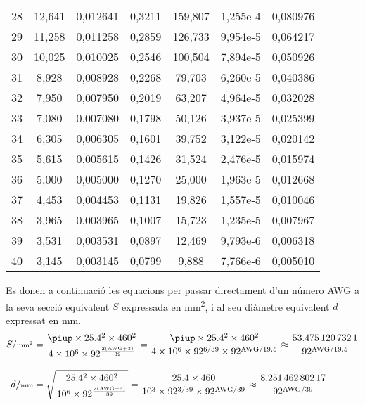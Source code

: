 \begin{longtable}{S[table-format=4.0]S[table-format=3.3]
                  S[table-format=2.6]S[table-format=2.4]
                  S[table-format=6.3]S[table-format=1.3e1]
                  S[table-format=3.6]}
28 &     12,641 &   0,012641 &     0,3211 &    159,807 &  1,255e-4 &   0,080976 \\
29 &     11,258 &   0,011258 &     0,2859 &    126,733 &  9,954e-5 &   0,064217 \\
30 &     10,025 &   0,010025 &     0,2546 &    100,504 &  7,894e-5 &   0,050926 \\
31 &      8,928 &   0,008928 &     0,2268 &     79,703 &  6,260e-5 &   0,040386 \\
32 &      7,950 &   0,007950 &     0,2019 &     63,207 &  4,964e-5 &   0,032028 \\
33 &      7,080 &   0,007080 &     0,1798 &     50,126 &  3,937e-5 &   0,025399 \\
34 &      6,305 &   0,006305 &     0,1601 &     39,752 &  3,122e-5 &   0,020142 \\
35 &      5,615 &   0,005615 &     0,1426 &     31,524 &  2,476e-5 &   0,015974 \\
36 &      5,000 &   0,005000 &     0,1270 &     25,000 &  1,963e-5 &   0,012668 \\
37 &      4,453 &   0,004453 &     0,1131 &     19,826 &  1,557e-5 &   0,010046 \\
38 &      3,965 &   0,003965 &     0,1007 &     15,723 &  1,235e-5 &   0,007967 \\
39 &      3,531 &   0,003531 &     0,0897 &     12,469 &  9,793e-6 &   0,006318 \\
40 &      3,145 &   0,003145 &     0,0799 &      9,888 &  7,766e-6 &   0,005010 \\
\bottomrule[1pt]
\end{longtable}

 Es donen a continuació les equacions per passar directament d'un número AWG a la seva secció equivalent $S$  expressada en \si{mm^2}, i al seu diàmetre equivalent $d$  expressat en \si{mm}.
\begin{align}
   S/{\scriptstyle\si{mm^2}}  &= \frac{ \piup \times \num{25,4}^2 \times 460^2}{4 \times 10^6 \times 92^{\frac{2(\text{AWG}+3)}{39}}} =
   \frac{ \piup \times \num{25,4}^2 \times 460^2}{4 \times 10^6 \times 92^{6/39} \times 92^{\text{AWG}/\num{19,5}}} \approx
   \frac{\num{53,4751207321}}{92^{\text{AWG}/\num{19,5}}}\label{eq:awg_mm2}\\[2ex]
   d/{\scriptstyle\si{mm}}  &= \sqrt{\frac{\num{25,4}^2 \times 460^2}{10^6 \times 92^{\frac{2(\text{AWG}+3)}{39}}}} =
   \frac{\num{25,4} \times 460}{10^3 \times 92^{3/39} \times 92^{\text{AWG}/39}} \approx
   \frac{\num{8,25146280217}}{92^{\text{AWG}/39}}\label{eq:awg_mm}
\end{align}


